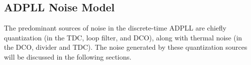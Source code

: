
\subsection{ADPLL Noise Model} \label{pn_theory}
	The predominant sources of noise in the discrete-time ADPLL are chiefly quantization (in the TDC, loop filter, and DCO), along with thermal noise (in the DCO, divider and TDC). The noise generated by these quantization sources will be discussed in the following sections.

